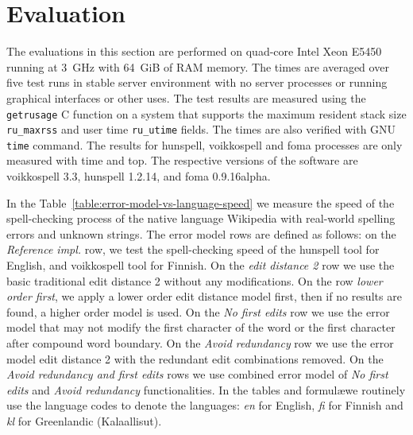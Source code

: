 \documentclass[11pt]{article}
\begin{document}
\section{Evaluation}
\label{sec:evaluation}

The evaluations in this section are performed on quad-core Intel Xeon E5450
running at 3~GHz with 64~GiB of RAM memory. The times are averaged over five
test runs in stable server environment with no server processes or running
graphical interfaces or other uses. The test results are measured using the
\texttt{getrusage} C function on a system that supports the maximum resident
stack size \texttt{ru\_maxrss} and user time \texttt{ru\_utime} fields. The
times are also verified with GNU \texttt{time} command. The results for
hunspell, voikkospell and foma processes are only measured with time and top.
The respective versions of the software are voikkospell 3.3, hunspell
1.2.14, and foma 0.9.16alpha.

In the Table~\ref{table:error-model-vs-language-speed} we measure the speed of
the spell-checking process of the native language Wikipedia with real-world
spelling errors and unknown strings. The error model rows are defined as
follows: on the \emph{Reference impl.} row, we test the spell-checking speed of
the hunspell tool for English, and voikkospell tool for Finnish. On the
\emph{edit distance 2} row we use the basic traditional edit distance 2 without
any modifications. On the row \emph{lower order first}, we apply a
lower order edit distance model first, then if no results are found,
a higher order model is used. On the \emph{No first edits} row we
use the error model that may not modify the first character of the word or the
first character after compound word boundary. On the \emph{Avoid redundancy}
row we use the error model edit distance 2 with the redundant edit combinations
removed. On the \emph{Avoid redundancy and first edits} rows we use combined
error model of \emph{No first edits} and \emph{Avoid redundancy}
functionalities.  In the tables and formul\ae we routinely use the language
codes to denote the languages: \emph{en} for English, \emph{fi} for Finnish and
\emph{kl} for Greenlandic (Kalaallisut). 
\end{document}
